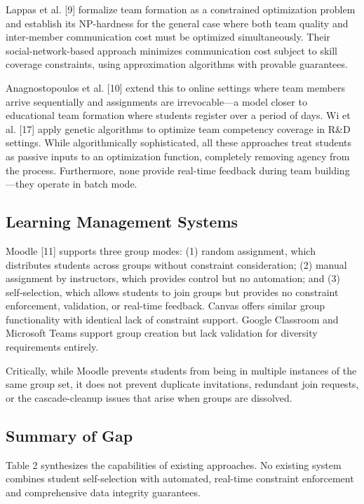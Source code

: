 \documentclass[12pt,a4paper]{article}
\begin{document}
Lappas et al. [9] formalize team formation as a constrained optimization problem and establish its NP-hardness for the general case where both team quality and inter-member communication cost must be optimized simultaneously. Their social-network-based approach minimizes communication cost subject to skill coverage constraints, using approximation algorithms with provable guarantees.

Anagnostopoulos et al. [10] extend this to online settings where team members arrive sequentially and assignments are irrevocable---a model closer to educational team formation where students register over a period of days. Wi et al. [17] apply genetic algorithms to optimize team competency coverage in R\&D settings. While algorithmically sophisticated, all these approaches treat students as passive inputs to an optimization function, completely removing agency from the process. Furthermore, none provide real-time feedback during team building---they operate in batch mode.

\subsection{Learning Management Systems}

Moodle [11] supports three group modes: (1) random assignment, which distributes students across groups without constraint consideration; (2) manual assignment by instructors, which provides control but no automation; and (3) self-selection, which allows students to join groups but provides no constraint enforcement, validation, or real-time feedback. Canvas offers similar group functionality with identical lack of constraint support. Google Classroom and Microsoft Teams support group creation but lack validation for diversity requirements entirely.

Critically, while Moodle prevents students from being in multiple instances of the same group set, it does not prevent duplicate invitations, redundant join requests, or the cascade-cleanup issues that arise when groups are dissolved.

\subsection{Summary of Gap}

Table 2 synthesizes the capabilities of existing approaches. No existing system combines student self-selection with automated, real-time constraint enforcement and comprehensive data integrity guarantees.
\end{document}
